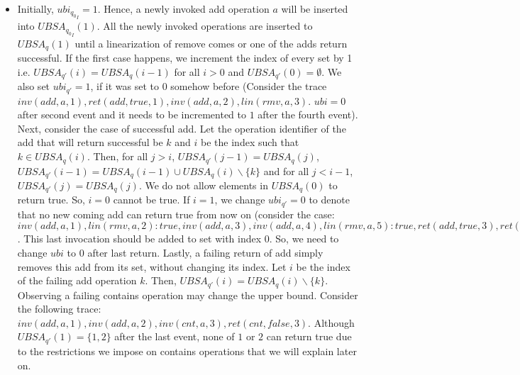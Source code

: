 \begin{itemize}
\begin{itemize}
\item[$UBSA$] Initially, $ubi_{{q_0}_I} = 1$. Hence, a newly invoked add operation $a$ will be inserted into $UBSA_{{q_0}_I}(1)$. All the newly invoked operations are inserted to $UBSA_q(1)$ until a linearization of remove comes or one of the adds return successful. If the first case happens, we increment the index of every set by 1 i.e. $UBSA_{q'}(i) = UBSA_q(i-1)$ for all $i>0$ and $UBSA_{q'}(0) = \emptyset$. We also set $ubi_{q'} = 1$, if it was set to $0$ somehow before (Consider the trace $inv(add,a,1), ret(add,true,1), inv(add,a,2), lin(rmv,a,3)$. $ubi =0$ after second event and it needs to be incremented to $1$ after the fourth event). Next, consider the case of successful add. Let the operation identifier of the add that will return successful be $k$ and $i$ be the index such that $k \in UBSA_q(i)$. Then, for all $j > i$, $UBSA_{q'} (j-1) = UBSA_q(j)$, $UBSA_{q'}(i-1) = UBSA_q(i-1) \cup UBSA_q(i) \backslash \{ k\}$ and for all $j < i-1$, $UBSA_{q'}(j) = UBSA_q(j)$. We do not allow elements in $UBSA_q(0)$ to return true. So, $i=0$ cannot be true. If $i = 1$, we change $ubi_{q'} = 0$ to denote that no new coming add can return true from now on (consider the case: $inv(add,a,1), lin(rmv,a,2):true, inv(add,a,3), inv(add,a,4), lin(rmv,a,5):true, ret(add,true,3), ret(add,true,4), inv(add,a,6)$. This last invocation should be added to set with index $0$. So, we need to change $ubi$ to $0$ after last return. Lastly, a failing return of add simply removes this add from its set, without changing its index. Let $i$ be the index of the failing add operation $k$. Then, $UBSA_{q'}(i) = UBSA_q(i) \backslash \{k\}$. Observing a failing contains operation may change the upper bound. Consider the following trace: $inv(add,a,1), inv(add,a,2), inv(cnt,a,3), ret(cnt,false,3)$. Although $UBSA_{q'}(1) = \{1,2\}$ after the last event, none of $1$ or $2$ can return true due to the restrictions we impose on contains operations that we will explain later on.

\end{itemize}
\end{itemize}
